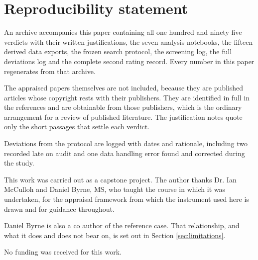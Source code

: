 \documentclass{article}
\begin{document}
\section*{Reproducibility statement}

An archive accompanies this paper containing all one hundred and ninety five verdicts with their
written justifications, the seven analysis notebooks, the fifteen derived data exports, the frozen
search protocol, the screening log, the full deviations log and the complete second rating record.
Every number in this paper regenerates from that archive.

The appraised papers themselves are not included, because they are published articles whose
copyright rests with their publishers. They are identified in full in the references and are
obtainable from those publishers, which is the ordinary arrangement for a review of published
literature. The
justification notes quote only the short passages that settle each verdict.

Deviations from the protocol are logged with dates and rationale, including two recorded late on
audit and one data handling error found and corrected during the study.

\begin{ack}
This work was carried out as a capstone project. The author thanks Dr. Ian McCulloh and Daniel
Byrne, MS, who taught the course in which it was undertaken, for the appraisal framework from which
the instrument used here is drawn and for guidance throughout.

Daniel Byrne is also a co author of the reference case. That relationship, and what it does and does
not bear on, is set out in Section \ref{sec:limitations}.

No funding was received for this work.
\end{ack}
\end{document}
